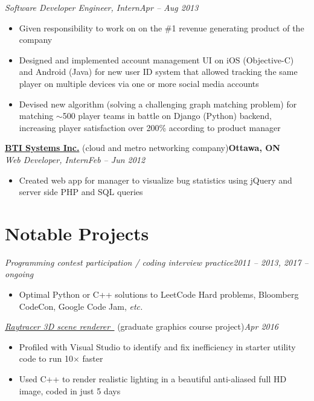\documentclass[10pt,letterpaper]{article}
\newcommand*\company[1]{\textbf{#1}}
\newcommand*\position[1]{\textit{#1}}
\newcommand*\location\company
\newcommand*\timespan\position
\begin{document}
\position{Software Developer Engineer, Intern}\hfill\timespan{Apr -- Aug 2013}
\begin{itemize}
\item Given responsibility to work on on the \#1 revenue generating product of the company
\item Designed and implemented account management UI on iOS (Objective-C) and Android (Java) for new user ID system that allowed tracking the same player on multiple devices via one or more social media accounts
\item Devised new algorithm (solving a challenging graph matching problem) for matching \(\sim\)500 player teams in battle on Django (Python) backend, increasing player satisfaction over 200\% according to product manager
\end{itemize}
\company{\href{http://www.juniper.net/us/en/dm/bti/}{BTI Systems Inc.}} (cloud and metro networking company)\hfill\location{Ottawa, ON}\\
\position{Web Developer, Intern}\hfill\timespan{Feb -- Jun 2012}
\begin{itemize}
\item Created web app for manager to visualize bug statistics using jQuery and server side PHP and SQL queries
\end{itemize}
\section*{Notable Projects}
\position{Programming contest participation / coding interview practice}\hfill\timespan{2011 -- 2013, 2017 -- ongoing}
\begin{itemize}
\item Optimal Python or C++ solutions to LeetCode Hard problems, Bloomberg CodeCon, Google Code Jam, \textit{etc.}
\end{itemize}
\position{\href{https://github.com/yumichael/raytrace}{Raytracer 3D scene renderer \faGithub\,\faExternalLink\xspace}} (graduate graphics course project)\hfill\timespan{Apr 2016}
\begin{itemize}
\item Profiled with Visual Studio to identify and fix inefficiency in starter utility code to run 10\(\times\) faster
\item Used C++ to render realistic lighting in a beautiful anti-aliased full HD image, coded in just 5 days
\end{itemize}
\end{document}
